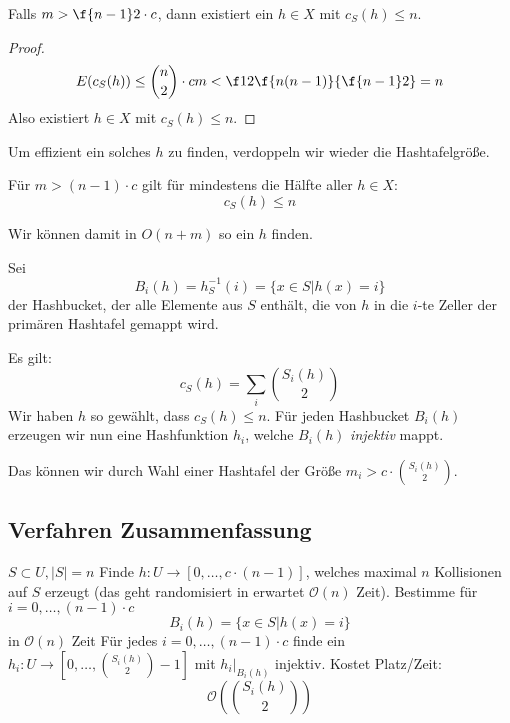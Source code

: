 \documentclass{mycourse}
\renewcommand{\O}{\mathcal{O}}
\begin{document}
\begin{kor}
	Falls $m>\f {n-1}2\cdot c$, dann existiert ein $h\in X$ mit $c_S(h)\le n$.
	\begin{proof}
		\[
			E(c_S(h)) \le \binom n2 \cdot cm < \f 12 \f {n(n-1)}{\f{n-1}2} = n
		\]
		Also existiert $h\in X$ mit $c_S(h)\le n$.
	\end{proof}
\end{kor}

Um effizient ein solches $h$ zu finden, verdoppeln  wir wieder die Hashtafelgröße.

\begin{kor}
	Für $m> (n-1)\cdot c$ gilt für mindestens die Hälfte aller $h\in X$:
	\[
		c_S(h) \le n
	\]
	\begin{note}
		Wir können damit in $O(n+m)$ so ein $h$ finden.
	\end{note}
\end{kor}

\begin{df}
	Sei 
	\[
		B_i(h) = h_S^{-1} (i) = \{x\in S\big| h(x)=i\}
	\]
	der Hashbucket, der alle Elemente aus $S$ enthält, die von $h$ in die $i$-te Zeller der primären Hashtafel gemappt wird.
\end{df}

Es gilt: 
\[
	c_S(h) = \sum_{i}\binom{S_i(h)}2
\]
Wir haben $h$ so gewählt, dass $c_S(h) \le n$.
Für jeden Hashbucket $B_i(h)$ erzeugen wir nun eine Hashfunktion $h_i$, welche $B_i(h)$ \emph{injektiv} mappt.

Das können wir durch Wahl einer Hashtafel der Größe $m_i > c\cdot \binom {S_i(h)}2$.


\subsection{Verfahren Zusammenfassung}

\begin{alg}
	\begin{algorithmic}
		\Require $S\subset U, |S| = n$
		\Statex
		\State Finde $h:U\to[0,\dotsc,c\cdot(n-1)]$, welches maximal $n$ Kollisionen auf $S$ erzeugt (das geht randomisiert in erwartet $\O(n)$ Zeit).
		\State Bestimme für $i=0,\dotsc, (n-1)\cdot c$
		\[
			B_i(h) = \{x\in S\big| h(x) = i\}
		\]
		in $\O(n)$ Zeit
		\State Für jedes $i=0,\dotsc, (n-1)\cdot c$ finde ein $h_i:U\to [0,\dotsc, \binom {S_i(h)}2 - 1]$ mit $h_i\big|_{B_i(h)}$ injektiv.
		Kostet Platz/Zeit:
		\[
			\O(\binom {S_i(h)}2)
		\]
	\end{algorithmic}
\end{alg}
\end{document}
